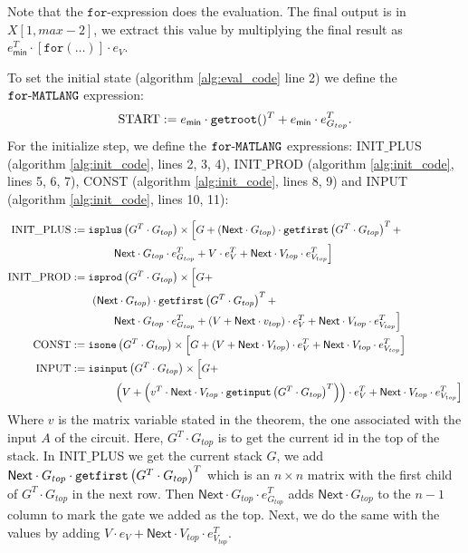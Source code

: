     Note that the $ \texttt{for}$-expression does the evaluation. The final output is in $X[1,max-2]$, we extract this value by multiplying the final result as $e_{\mathsf{min}}^T\cdot [\texttt{for}(\ldots )]\cdot e_{V}$.

    To set the initial state (algorithm \ref{alg:eval_code} line 2) we define the $\texttt{for}\text{-}\texttt{MATLANG}$ expression: $$\text{START}:= e_{\mathsf{min}}\cdot \texttt{getroot}()^T + e_{\mathsf{min}}\cdot e_{G_{top}}^T.$$
    For the initialize step, we define the $\texttt{for}\text{-}\texttt{MATLANG}$ expressions: INIT${\_}$PLUS (algorithm \ref{alg:init_code}, lines 2, 3, 4), INIT${\_}$PROD (algorithm \ref{alg:init_code}, lines 5, 6, 7), CONST (algorithm \ref{alg:init_code}, lines 8, 9) and INPUT (algorithm \ref{alg:init_code}, lines 10, 11):

    \begin{align*}\allowdisplaybreaks
        \text{INIT{\_}PLUS} &:= \isplus{G^T\cdot G_{top}}\times \Big[ G + 
       (\mathsf{Next}\cdot G_{top}) \cdot \getfirst{G^T\cdot G_{top}}^T  + \\
        &\hspace{4em}\mathsf{Next}\cdot G_{top}\cdot e_{G_{top}}^T +V\cdot e_{V}^T + \mathsf{Next}\cdot V_{top}\cdot e_{V_{top}}^T \Big] \\
        \text{INIT{\_}PROD} &:= \isprod{G^T\cdot G_{top}}\times \Big[ G + \\
        &\hspace{2em}(\mathsf{Next}\cdot G_{top}) \cdot \getfirst{G^T\cdot G_{top}}^T + \\
        &\hspace{4em}\mathsf{Next}\cdot G_{top}\cdot e_{G_{top}}^T +(V + \mathsf{Next}\cdot v_{top})\cdot e_{V}^T + \mathsf{Next}\cdot V_{top}\cdot e_{V_{top}}^T \Big] \\
        \text{CONST} &:= \isone{G^T\cdot G_{top}}\times \left[ G + (V + \mathsf{Next}\cdot V_{top})\cdot e_{V}^T + \mathsf{Next}\cdot V_{top}\cdot e_{V_{top}}^T \right] \\
        \text{INPUT} &:= \isinput{G^T\cdot G_{top}}\times \Big[ G + \\
        &\hspace{4em}\left(V + \left( v^T \cdot \mathsf{Next}\cdot V_{top} \cdot \getinput{G^T\cdot G_{top}}^T \right)\right)\cdot e_{V}^T + \mathsf{Next}\cdot V_{top}\cdot e_{V_{top}}^T \Big]
    \end{align*} 
    Where $v$ is the matrix variable stated in the theorem, the one associated with the input $A$ of the circuit.
    Here, $G^T\cdot G_{top}$ is to get the current id in the top of the stack. In INIT${\_}$PLUS we get the current stack $G$, we add $\mathsf{Next}\cdot G_{top} \cdot \texttt{getfirst}\left(G^T\cdot G_{top} \right)^T$ which is an $n\times n$ matrix with the first child of $G^T\cdot G_{top}$ in the next row. Then $\mathsf{Next}\cdot G_{top}\cdot e_{G_{top}}^T$ adds $\mathsf{Next}\cdot G_{top}$ to the $n-1$ column to mark the gate we added as the top. Next, we do the same with the values by adding $V\cdot e_{V} + \mathsf{Next}\cdot V_{top}\cdot e_{V_{top}}^T$.

